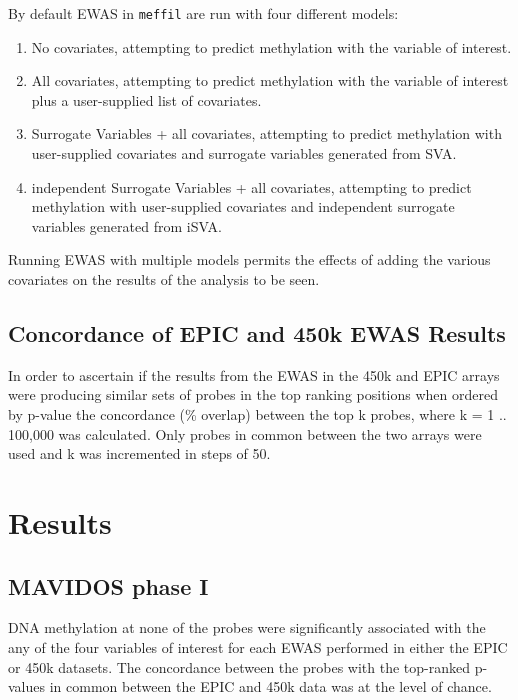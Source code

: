\documentclass[
]{book}
\providecommand{\tightlist}{%
  \setlength{\itemsep}{0pt}\setlength{\parskip}{0pt}}
\begin{document}
By default EWAS in \texttt{meffil} are run with four different models:

\begin{enumerate}
\def\labelenumi{\arabic{enumi}.}
\tightlist
\item
  No covariates, attempting to predict methylation with the variable of interest.
\item
  All covariates, attempting to predict methylation with the variable of interest plus a user-supplied list of covariates.
\item
  Surrogate Variables + all covariates, attempting to predict methylation with user-supplied covariates and surrogate variables generated from SVA.
\item
  independent Surrogate Variables + all covariates, attempting to predict methylation with user-supplied covariates and independent surrogate variables generated from iSVA.
\end{enumerate}

Running EWAS with multiple models permits the effects of adding the various covariates on the results of the analysis to be seen.

\hypertarget{concordance-of-epic-and-450k-ewas-results}{%
\subsection{Concordance of EPIC and 450k EWAS Results}\label{concordance-of-epic-and-450k-ewas-results}}

In order to ascertain if the results from the EWAS in the 450k and EPIC arrays were producing similar sets of probes in the top ranking positions when ordered by p-value the concordance (\% overlap) between the top k probes, where k = 1 .. 100,000 was calculated.
Only probes in common between the two arrays were used and k was incremented in steps of 50.

\hypertarget{results}{%
\section{Results}\label{results}}

\hypertarget{mavidos-phase-i}{%
\subsection{MAVIDOS phase I}\label{mavidos-phase-i}}

DNA methylation at none of the probes were significantly associated with the any of the four variables of interest for each EWAS performed in either the EPIC or 450k datasets.
The concordance between the probes with the top-ranked p-values in common between the EPIC and 450k data was at the level of chance.
\end{document}
